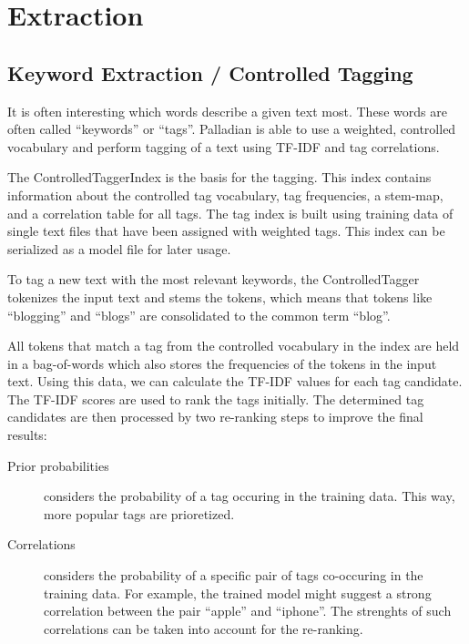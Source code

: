 \documentclass[a4paper,twoside]{book}      %
\begin{document}

\section{Extraction}

\subsection{Keyword Extraction / Controlled Tagging}
It is often interesting which words describe a given text most. These words are often called ``keywords'' or ``tags''. Palladian is able to use a weighted, controlled vocabulary and perform tagging of a text using TF-IDF and tag correlations.

The ControlledTaggerIndex is the basis for the tagging. This index contains information about the controlled tag vocabulary, tag frequencies, a stem-map, and a correlation table for all tags. The tag index is built using training data of single text files that have been assigned with weighted tags. This index can be serialized as a model file for later usage.

To tag a new text with the most relevant keywords, the ControlledTagger tokenizes the input text and stems the tokens, which means that tokens like ``blogging'' and ``blogs'' are consolidated to the common term ``blog''.

All tokens that match a tag from the controlled vocabulary in the index are held in a bag-of-words which also stores the frequencies of the tokens in the input text. Using this data, we can calculate the TF-IDF values for each tag candidate. The TF-IDF scores are used to rank the tags initially. The determined tag candidates are then processed by two re-ranking steps to improve the final results:

\begin{description}

	\item [Prior probabilities] considers the probability of a tag occuring in the training data. This way, more popular tags are prioretized.

	\item [Correlations] considers the probability of a specific pair of tags co-occuring in the training data. For example, the trained model might suggest a strong correlation between the pair ``apple'' and ``iphone''. The strenghts of such correlations can be taken into account for the re-ranking.

\end{description}
\end{document}
